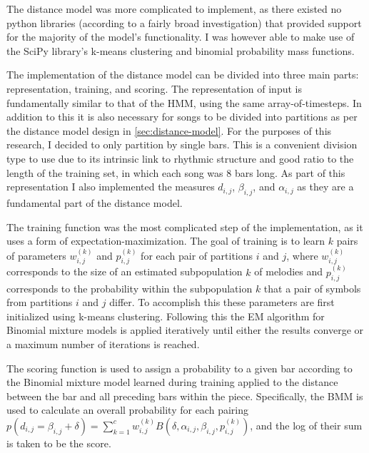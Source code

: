 \documentclass[ author={Stephen Livermore-Tozer},
				supervisor={Dr. Peter Flach},
				degree={MEng},
				title={Algorithmic Co-composition Using Machine Learning},
				subtitle={},
				type={research},
				year={2016} ]{dissertation}
\begin{document}
	The distance model was more complicated to implement, as there existed no python libraries (according to a fairly broad investigation) that provided support for the majority of the model's functionality. I was however able to make use of the SciPy library's k-means clustering and binomial probability mass functions. 
	
	The implementation of the distance model can be divided into three main parts: representation, training, and scoring. The representation of input is fundamentally similar to that of the HMM, using the same array-of-timesteps. In addition to this it is also necessary for songs to be divided into partitions as per the distance model design in \ref{sec:distance-model}. For the purposes of this research, I decided to only partition by single bars. This is a convenient division type to use due to its intrinsic link to rhythmic structure and good ratio to the length of the training set, in which each song was 8 bars long. As part of this representation I also implemented the measures $d_{i,j}$, $\beta_{i,j}$, and $\alpha_{i,j}$ as they are a fundamental part of the distance model.
	
	The training function was the most complicated step of the implementation, as it uses a form of expectation-maximization. The goal of training is to learn $k$ pairs of parameters $w^{(k)}_{i,j}$ and $p^{(k)}_{i,j}$ for each pair of partitions $i$ and $j$, where $w^{(k)}_{i,j}$ corresponds to the size of an estimated subpopulation $k$ of melodies and $p^{(k)}_{i,j}$ corresponds to the probability within the subpopulation $k$ that a pair of symbols from partitions $i$ and $j$ differ. To accomplish this these parameters are first initialized using k-means clustering. Following this the EM algorithm for Binomial mixture models \cite{bilmes1998gentle} is applied iteratively until either the results converge or a maximum number of iterations is reached. 
	
	The scoring function is used to assign a probability to a given bar according to the Binomial mixture model learned during training applied to the distance between the bar and all preceding bars within the piece. Specifically, the BMM is used to calculate an overall probability for each pairing $p(d_{i,j} = \beta_{i,j} + \delta) = \sum_{k=1}^{c} w_{i,j}^{(k)} B(\delta,\alpha_{i,j},\beta_{i,j},p_{i,j}^{(k)})$, and the log of their sum is taken to be the score.
	
\end{document}
